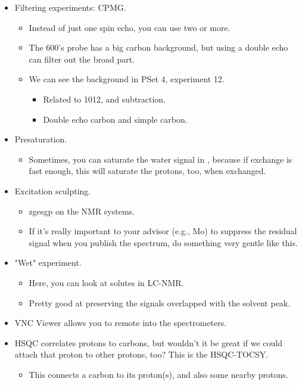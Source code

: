 \documentclass[../notes.tex]{subfiles}
\begin{document}
\begin{itemize}
    \item Filtering experiments: CPMG.
    \begin{itemize}
        \item Instead of just one spin echo, you can use two or more.
        \item The 600's probe has a big carbon background, but using a double echo can filter out the broad part.
        \item We can see the background in PSet 4, experiment 12.
        \begin{itemize}
            \item Related to 1012, and subtraction.
            \item Double echo carbon and simple carbon.
        \end{itemize}
    \end{itemize}
    \item Presaturation.
    \begin{itemize}
        \item Sometimes, you can saturate the water signal in , because if exchange is fast enough, this will saturate the  protons, too, when exchanged.
    \end{itemize}
    \item Excitation sculpting.
    \begin{itemize}
        \item zgesgp on the NMR systems.
        \item If it's really important to your advisor (e.g., Mo) to suppress the  residual signal when you publish the spectrum, do something very gentle like this.
    \end{itemize}
    \item "Wet" experiment.
    \begin{itemize}
        \item Here, you can look at solutes in LC-NMR.
        \item Pretty good at preserving the signals overlapped with the solvent peak.
    \end{itemize}
    \item VNC Viewer allows you to remote into the spectrometers.
    \item HSQC correlates protons to carbons, but wouldn't it be great if we could attach that proton to other protons, too? This is the HSQC-TOCSY.
    \begin{itemize}
        \item This connects a carbon to its proton(s), and also some nearby protons.

\end{itemize}
\end{itemize}
\end{document}
